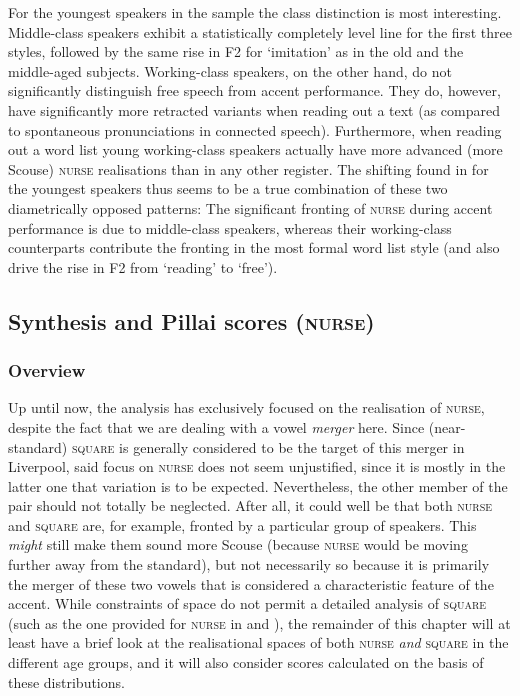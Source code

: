 For the youngest speakers in the sample the class distinction is most interesting.
Middle-class speakers exhibit a statistically completely level line for the first three styles, followed by the same rise in F2 for `imitation' as in the old and the middle-aged subjects.
Working-class speakers, on the other hand, do not significantly distinguish free speech from accent performance.
They do, however, have significantly more retracted variants when reading out a text (as compared to spontaneous pronunciations in connected speech).
Furthermore, when reading out a word list young working-class speakers actually have more advanced (more Scouse) \textsc{nurse} realisations than in any other register.
The shifting found in  for the youngest speakers thus seems to be a true combination of these two diametrically opposed patterns: The significant fronting of \textsc{nurse} during accent performance is due to middle-class speakers, whereas their working-class counterparts contribute the fronting in the most formal word list style (and also drive the rise in F2 from `reading' to `free').

\subsection{Synthesis and Pillai scores (\textsc{nurse})}
\label{sec.prod.res.vow.nurse.pil}

\subsubsection{Overview}
Up until now, the analysis has exclusively focused on the realisation of \textsc{nurse}, despite the fact that we are dealing with a vowel \emph{merger} here.
Since (near-stan\-dard) \textsc{square} is generally considered to be the target of this merger in Liverpool, said focus on \textsc{nurse} does not seem unjustified, since it is mostly in the latter one that variation is to be expected.
Nevertheless, the other member of the pair should not totally be neglected.
After all, it could well be that both \textsc{nurse} and \textsc{square} are, for example, fronted by a particular group of speakers.
This \emph{might} still make them sound more Scouse (because \textsc{nurse} would be moving further away from the standard), but not necessarily so because it is primarily the merger of these two vowels that is considered a characteristic feature of the accent.
While constraints of space do not permit a detailed analysis of \textsc{square} (such as the one provided for \textsc{nurse} in  and ), the remainder of this chapter will at least have a brief look at the realisational spaces of both \textsc{nurse} \emph{and} \textsc{square} in the different age groups, and it will also consider  scores calculated on the basis of these distributions.

